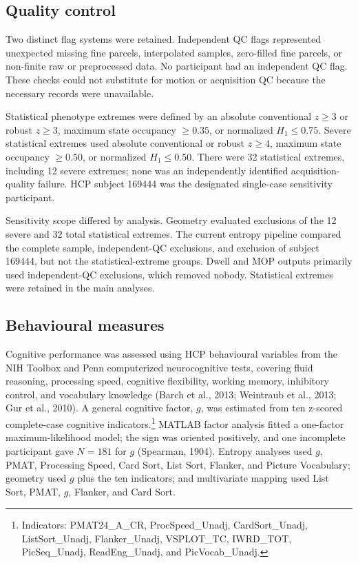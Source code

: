 \documentclass[12pt,a4paper]{report}
\begin{document}
\subsection{Quality control}

Two distinct flag systems were retained. Independent QC flags represented unexpected missing fine parcels, interpolated samples, zero-filled fine parcels, or non-finite raw or preprocessed data. No participant had an independent QC flag. These checks could not substitute for motion or acquisition QC because the necessary records were unavailable.

Statistical phenotype extremes were defined by an absolute conventional $z\geq3$ or robust $z\geq3$, maximum state occupancy $\geq0.35$, or normalized $H_1\leq0.75$. Severe statistical extremes used absolute conventional or robust $z\geq4$, maximum state occupancy $\geq0.50$, or normalized $H_1\leq0.50$. There were 32 statistical extremes, including 12 severe extremes; none was an independently identified acquisition-quality failure. HCP subject 169444 was the designated single-case sensitivity participant.

Sensitivity scope differed by analysis. Geometry evaluated exclusions of the 12 severe and 32 total statistical extremes. The current entropy pipeline compared the complete sample, independent-QC exclusions, and exclusion of subject 169444, but not the statistical-extreme groups. Dwell and MOP outputs primarily used independent-QC exclusions, which removed nobody. Statistical extremes were retained in the main analyses.

\subsection{Behavioural measures}

Cognitive performance was assessed using HCP behavioural variables from the NIH Toolbox and Penn computerized neurocognitive tests, covering fluid reasoning, processing speed, cognitive flexibility, working memory, inhibitory control, and vocabulary knowledge (Barch et al., 2013; Weintraub et al., 2013; Gur et al., 2010). A general cognitive factor, \(g\), was estimated from ten z-scored complete-case cognitive indicators.\footnote{\scriptsize Indicators: PMAT24\_A\_CR, ProcSpeed\_Unadj, CardSort\_Unadj, ListSort\_Unadj, Flanker\_Unadj, VSPLOT\_TC, IWRD\_TOT, PicSeq\_Unadj, ReadEng\_Unadj, and PicVocab\_Unadj.} MATLAB factor analysis fitted a one-factor maximum-likelihood model; the sign was oriented positively, and one incomplete participant gave \(N=181\) for \(g\) (Spearman, 1904). Entropy analyses used \(g\), PMAT, Processing Speed, Card Sort, List Sort, Flanker, and Picture Vocabulary; geometry used \(g\) plus the ten indicators; and multivariate mapping used List Sort, PMAT, \(g\), Flanker, and Card Sort.
\end{document}
